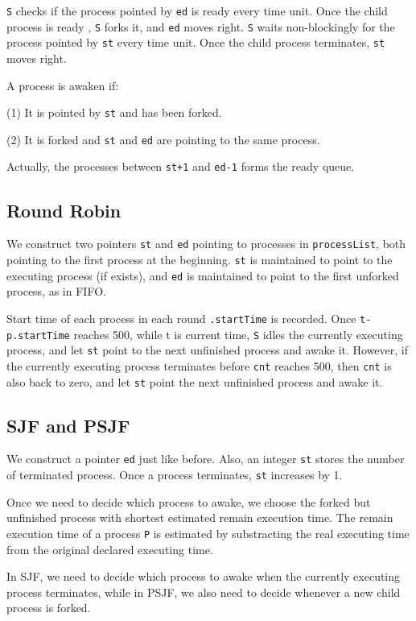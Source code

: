 \documentclass{article}
\begin{document}
        {\tt S} checks if the process pointed by {\tt ed} is ready every time unit. Once the child process is ready , {\tt S} forks it, and {\tt ed} moves right. {\tt S} waits non-blockingly for the process pointed by {\tt st} every time unit. Once the child process terminates, {\tt st} moves right.

        A process is awaken if: 

        (1) It is pointed by {\tt st} and has been forked.

        (2) It is forked and {\tt st} and {\tt ed} are pointing to the same process.

        Actually, the processes between {\tt st+1} and {\tt ed-1} forms the ready queue.

    \subsection{Round Robin}
        We construct two pointers {\tt st} and {\tt ed} pointing to processes in {\tt processList}, both pointing to the first process at the beginning. {\tt st} is maintained to point to the executing process (if exists), and {\tt ed} is maintained to point to the first unforked process, as in FIFO.

        Start time of each process in each round {\tt .startTime} is recorded. Once {\tt t-p.startTime} reaches 500, while t is current time, {\tt S} idles the currently executing process, and let {\tt st} point to the next unfinished process and awake it. However, if the currently executing process terminates before {\tt cnt} reaches 500, then {\tt cnt} is also back to zero, and let {\tt st} point the next unfinished process and awake it.

    \subsection{SJF and PSJF}
        We construct a pointer {\tt ed} just like before. Also, an integer {\tt st} stores the number of terminated process. Once a process terminates, {\tt st} increases by 1.

        Once we need to decide which process to awake, we choose the forked but unfinished process with shortest estimated remain execution time. The remain execution time of a process {\tt P} is estimated by substracting the real executing time from the original declared executing time.
        
        In SJF, we need to decide which process to awake when the currently executing process terminates, while in PSJF, we also need to decide whenever a new child process is forked.
\end{document}
